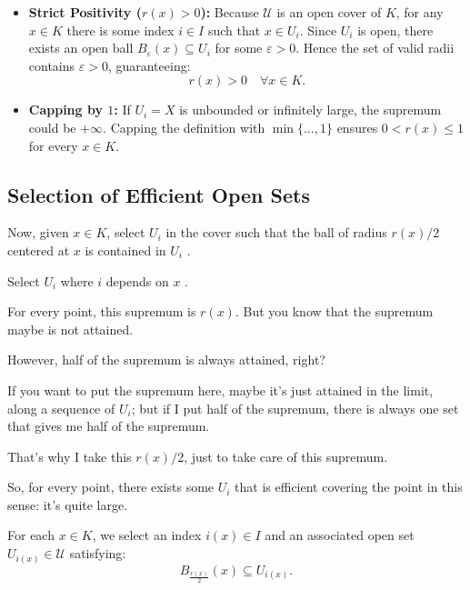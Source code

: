 \begin{proofWrapper}
\begin{content}
\begin{steps}
\begin{itemize}
    \item \textbf{Strict Positivity ($r(x) > 0$):} Because $\mathcal{U}$ is an open cover of $K$, for any $x \in K$ there is some index $i \in I$ such that $x \in U_i$. Since $U_i$ is open, there exists an open ball $B_\varepsilon(x) \subseteq U_i$ for some $\varepsilon > 0$. Hence the set of valid radii contains $\varepsilon > 0$, guaranteeing:
    \[
    r(x) > 0 \quad \forall x \in K.
    \]
    \item \textbf{Capping by $1$:} If $U_i = X$ is unbounded or infinitely large, the supremum could be $+\infty$. Capping the definition with $\min\{\dots, 1\}$ ensures $0 < r(x) \le 1$ for every $x \in K$.
\end{itemize}
\end{steps}
\end{content}

\subsection{Selection of Efficient Open Sets}

\begin{speech}[01:12:43 - 01:14:45]
Now, given $x \in K$, select $U_i$ in the cover such that the ball of radius $r(x) / 2$ centered at $x$ is contained in $U_i$ .

Select $U_i$ where $i$ depends on $x$ .

For every point, this supremum is $r(x)$. But you know that the supremum maybe is not attained.

However, half of the supremum is always attained, right?

If you want to put the supremum here, maybe it's just attained in the limit, along a sequence of $U_i$; but if I put half of the supremum, there is always one set that gives me half of the supremum.

That's why I take this $r(x) / 2$, just to take care of this supremum.

So, for every point, there exists some $U_i$ that is efficient covering the point in this sense: it's quite large.
\end{speech}

\begin{content}
For each $x \in K$, we select an index $i(x) \in I$ and an associated open set $U_{i(x)} \in \mathcal{U}$ satisfying:
\begin{equation}\label{eq:half-radius-inclusion}
B_{\frac{r(x)}{2}}(x) \subseteq U_{i(x)}.
\end{equation}


\end{content}
\end{proofWrapper}
